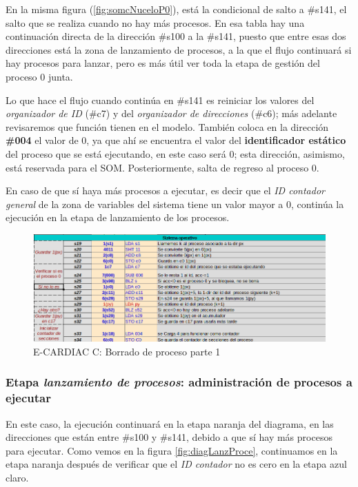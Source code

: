 \documentclass[letterpaper,12pt,oneside]{book}
\begin{document}
  
  
        En la misma figura (\ref{fig:somcNuceloP0}),
		está la condicional de salto a \#s141, el salto que se realiza cuando no hay más procesos. En esa tabla hay una continuación directa de la dirección 
		\#s100 a 
		la \#s141, puesto que entre esas dos direcciones está la zona
		de lanzamiento de procesos, a la que el flujo continuará si hay procesos para lanzar, pero es más útil ver toda la etapa de gestión del proceso
		0 junta. 
		
		Lo que hace el flujo cuando continúa en
		\#s141 es reiniciar los valores del \textit{organizador de ID} (\#c7) y del \textit{organizador de direcciones} (\#c6);
		 más adelante revisaremos que función tienen en el modelo. También coloca en la dirección 
		\textbf{\#004} el valor de 0, ya que ahí se encuentra el valor del \textbf{identificador 
		estático} del proceso que se está ejecutando, en este caso será 0; esta dirección, asimismo, está reservada para el SOM. 
		Posteriormente, salta de 
		regreso al proceso 0.
		
		
		
		
		En caso de que sí haya más procesos a ejecutar, es decir que 
		el \textit{ID contador general} de la zona de variables del sistema tiene un valor mayor a 0, continúa la
		ejecución en la etapa de lanzamiento de los procesos.

		
		\begin{figure}[h]		
			\centering
			\includegraphics[scale=0.53]{media/CARDIACC/SO_Borrar1.png}
			\caption{ E-CARDIAC C: Borrado de proceso parte 1}
			\label{fig:somcBorrar1}
		\end{figure}
		
		
		


		\subsubsection{Etapa \textit{lanzamiento de procesos}: administración de procesos a ejecutar }		
		En este caso, la ejecución continuará en la etapa naranja del diagrama, en las direcciones que están entre \#s100 y \#s141, debido a que sí 
		hay más procesos para ejecutar. Como vemos en
		la figura \ref{fig:diagLanzProce}, continuamos en la etapa naranja después de verificar que el \textit{ID contador} no es cero
		en la etapa azul claro. 
		
\end{document}
